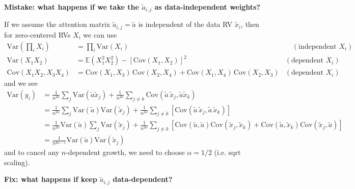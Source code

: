 \documentclass{article}
\begin{document}
\textbf{Mistake: what happens if we take the $\tilde {a}_{i,j}$ as data-independent weights?}

If we assume the attention matrix $\tilde {a}_{i,j}=\tilde a$ is independent of the data RV $\tilde x_i$, then for zero-centered RVs $X_i$ we can use
\begin{align}
    \textrm{Var}\left(\prod_i X_i\right)
    &=
    \prod_i \textrm{Var}(X_i) & \quad(\textrm{independent } X_i)\\
    \textrm{Var}(X_1X_2) &=\mathbb E\left(X_1^2X_2^2\right)-\left[\textrm{Cov}(X_1,X_2)\right]^2& (\textrm{dependent } X_i)\\
    \textrm{Cov}(X_1X_2,X_3X_4)
    &=
    \textrm{Cov}(X_1,X_3)\,\textrm{Cov}(X_2,X_4)+
    \textrm{Cov}(X_1,X_4)\,\textrm{Cov}(X_2,X_3) &(\textrm{dependent } X_i)
\end{align}
and we see
\begin{align}
\textrm{Var}(y_i) 
&= \frac1{n^{2\alpha}}\sum_{j}\textrm{Var}\left(  \tilde{a}\tilde{x}_j\right) 
+ \frac1{n^{2\alpha}}\sum_{j\neq k}\textrm{Cov}\left( \tilde{a}\,\tilde{x}_j, \tilde{a}\tilde{x}_k\right)\\
&= \frac1{n^{2\alpha}}\sum_{j}\textrm{Var}\left(\tilde{a}\right)\textrm{Var}\left(  \tilde{x}_j\right) 
+ \frac1{n^{2\alpha}}\sum_{j\neq k}
\left[\textrm{Cov}\left( \tilde{a}\,\tilde{x}_j, \tilde{a}\,\tilde{x}_k\right)\right]\\
&= 
\frac1{n^{2\alpha}}
\textrm{Var}\left(\tilde{a}\right)
\sum_{j}\textrm{Var}\left(  \tilde{x}_j\right) 
+ \frac1{n^{2\alpha}}\sum_{j\neq k}
\left[
\textrm{Cov}\left( \tilde{a}, \tilde{a}\right) 
\textrm{Cov}\left( \tilde{x}_j, \tilde{x}_k\right)
+
\textrm{Cov}\left( \tilde{a}, \tilde{x}_k\right) 
\textrm{Cov}\left( \tilde{x}_j,  \tilde{a}\right)
\right]\\
&= 
\frac1{n^{2\alpha - 1}}
\textrm{Var}\left(\tilde{a}\right)
\textrm{Var}\left(  \tilde{x}_j\right) 
\end{align}
and to cancel any $n$-dependent growth, we need to choose $\alpha = 1/2$ (i.e. sqrt scaling).

\textbf{Fix: what happens if keep $\tilde {a}_{i,j}$ data-dependent?}
\end{document}

